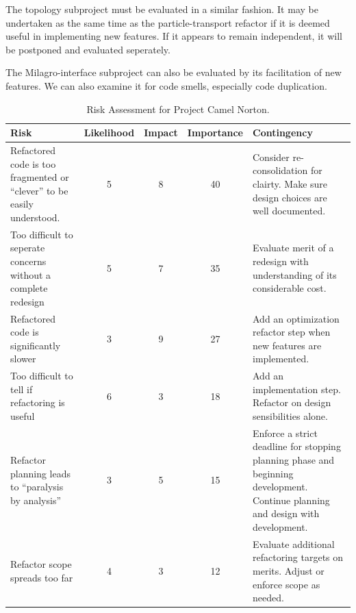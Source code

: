 \documentclass[11pt]{nmemo}
\begin{document}
The topology subproject must be evaluated in a similar fashion. It may
be undertaken as the same time as the particle-transport refactor if
it is deemed useful in implementing new features. If it appears to
remain independent, it will be postponed and evaluated seperately.

The Milagro-interface subproject can also be evaluated by its
facilitation of new features. We can also examine it for code smells,
especially code duplication.

\begin{table}[ht]
  \begin{center}
    \caption{Risk Assessment for Project Camel Norton.}
    \label{tab:risk}
    \begin{tabular}{|p{4.5cm}|c|c|c|p{4.5cm}|} 
    \hline
    Risk & Likelihood & Impact & Importance & Contingency \\ 
    \hline\hline
    Refactored code is too fragmented or ``clever'' to be easily understood.
    & 5 & 8 & 40 &
    Consider re-consolidation for clairty. Make sure design choices are
    well documented. 
    \\ \hline
    Too difficult to seperate concerns without a complete redesign
    & 5 & 7 & 35 & Evaluate merit of a redesign with understanding of
    its considerable cost. \\ \hline
    Refactored code is significantly slower & 3 & 9 & 27 &
    Add an optimization refactor step when new features are
    implemented. 
    \\ \hline
    Too difficult to tell if refactoring is useful & 6 & 3 & 18 &
    Add an implementation step. Refactor on design sensibilities alone.
    \\ \hline
    Refactor planning leads to ``paralysis by analysis'' & 
    3 & 5 & 15 &
    Enforce a strict deadline for stopping planning phase and
    beginning development. Continue planning and design with
    development. 
    \\ \hline
    Refactor scope spreads too far & 4 & 3 & 12 &
    Evaluate additional refactoring targets on merits. Adjust or
    enforce scope as needed. 
    \\ \hline
    \end{tabular}
  \end{center}
\end{table}
\end{document}
